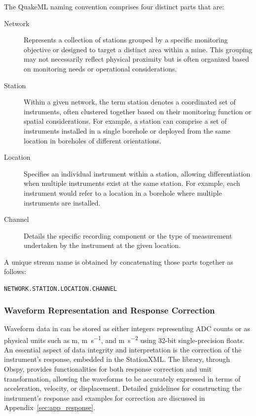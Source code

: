The QuakeML naming convention comprises four distinct parts that are:

\begin{description}
  \item[Network] Represents a collection of stations grouped by a specific monitoring objective or designed to target a distinct area within a mine. This grouping may not necessarily reflect physical proximity but is often organized based on monitoring needs or operational considerations.
  \item[Station] Within a given network, the term station denotes a coordinated set of instruments, often clustered together based on their monitoring function or spatial considerations. For example, a station can comprise a set of instruments installed in a single borehole or deployed from the same location in boreholes of different orientations.
  \item[Location] Specifies an individual instrument within a station, allowing differentiation when multiple instruments exist at the same station. For example, each instrument would refer to a location in a borehole where multiple instruments are installed.
  \item[Channel] Details the specific recording component or the type of measurement undertaken by the instrument at the given location.
\end{description}

A unique stream name is obtained by concatenating those parts together as follows:
\begin{center}
\texttt{NETWORK.STATION.LOCATION.CHANNEL}
\end{center}

\subsubsection{Waveform Representation and Response Correction}

Waveform data in \museismic can be stored as either integers representing ADC counts or as physical units such as \si{\meter}, \si{\meter\per\second}, and \si{\meter\per\second\squared} using 32-bit single-precision floats. An essential aspect of data integrity and interpretation is the correction of the instrument's response, embedded in the StationXML. The \muquake library, through Obspy, provides functionalities for both response correction and unit transformation, allowing the waveforms to be accurately expressed in terms of acceleration, velocity, or displacement. Detailed guidelines for constructing the instrument's response and examples for correction are discussed in Appendix~\ref{sec:app_response}.

